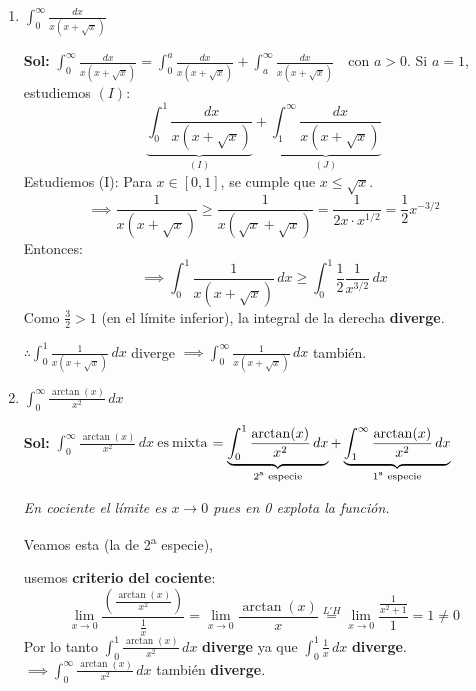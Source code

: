 \documentclass[letterpaper,12pt]{article}
\theoremstyle{plain}
\theoremstyle{definition}
\begin{document}
\begin{enumerate}
\begin{enumerate}
\begin{enumerate}
        \item $\displaystyle \int_0^{\infty} \frac{dx}{x(x+\sqrt{x})}$

\color{blue}
\textbf{Sol:} $\displaystyle \int_{0}^{\infty} \frac{dx}{x(x+\sqrt{x})} = \int_{0}^{a} \frac{dx}{x(x+\sqrt{x})} + \int_{a}^{\infty} \frac{dx}{x(x+\sqrt{x})} \quad \text{con } a > 0$.  Si $a = 1$, estudiemos $(I)$:
\[ \underbrace{\int_{0}^{1} \frac{dx}{x(x+\sqrt{x})}}_{(I)} + \underbrace{\int_{1}^{\infty} \frac{dx}{x(x+\sqrt{x})}}_{(J)} \]
Estudiemos (I): Para $x \in [0, 1]$, se cumple que $x \leq \sqrt{x}$.
\[ \implies \frac{1}{x(x+\sqrt{x})} \geq \frac{1}{x(\sqrt{x}+\sqrt{x})} = \frac{1}{2x \cdot x^{1/2}} = \frac{1}{2} x^{-3/2} \]
Entonces:
\[ \implies \int_{0}^{1} \frac{1}{x(x+\sqrt{x})} \, dx \geq \int_{0}^{1} \frac{1}{2} \frac{1}{x^{3/2}} \, dx \]
Como $\frac{3}{2} > 1$ (en el límite inferior), la integral de la derecha \textbf{diverge}.

$\therefore \displaystyle \int_{0}^{1} \frac{1}{x(x+\sqrt{x})} \, dx$ diverge $\displaystyle \implies \int_{0}^{\infty} \frac{1}{x(x+\sqrt{x})} \, dx$ también.
\color{black}
        
        \item $\displaystyle \int_{0}^\infty \frac{\arctan(x)}{x^2} \, dx$

\color{blue}
\textbf{Sol:} $\displaystyle \int_{0}^{\infty} \frac{\arctan(x)}{x^2} \, dx \ \text{es} \ \text{mixta}$
\noindent $\displaystyle = \underbrace{\int_{0}^{1} \frac{\arctan(x)}{x^2} \, dx}_{\text{2\textsuperscript{a} especie}} + \underbrace{\int_{1}^{\infty} \frac{\arctan(x)}{x^2} \, dx}_{\text{1\textsuperscript{a} especie}}$
\quad 

\begin{minipage}[t]{0.4\textwidth}
\textit{En cociente el límite es $x \to 0$ pues en 0 explota la función.}
\end{minipage}
\noindent Veamos esta (la de 2\textsuperscript{a} especie),

usemos \textbf{criterio del cociente}:
\[
\lim_{x \to 0} \frac{\left( \frac{\arctan(x)}{x^2} \right)}{\frac{1}{x}} = \lim_{x \to 0} \frac{\arctan(x)}{x} \stackrel{L'H}{=} \lim_{x \to 0} \frac{\frac{1}{x^2+1}}{1} = 1 \neq 0
\]
\noindent Por lo tanto $\displaystyle \int_{0}^{1} \frac{\arctan(x)}{x^2} \, dx$ \textbf{diverge} ya que $\displaystyle \int_{0}^{1} \frac{1}{x} \, dx$ \textbf{diverge}. $\implies \displaystyle \int_{0}^{\infty} \frac{\arctan(x)}{x^2} \, dx$ también \textbf{diverge}.
\color{black}
        
    \end{enumerate}


\end{enumerate}
\end{enumerate}
\end{document}
